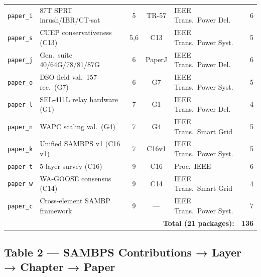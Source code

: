 \documentclass[11pt,a4paper]{article}
\begin{document}
{\begin{longtable}{llccp{3.0cm}r}
\rowcolor{ch5col!8}
\texttt{paper\_i} & 87T SPRT inrush/IBR/CT-sat & 5 & TR-57 & IEEE Trans.\ Power Del. & 6 \\
\rowcolor{ch5col!8}
\texttt{paper\_s} & CUEP conservativeness (C13) & 5,6 & C13 & IEEE Trans.\ Power Syst. & 5 \\
\rowcolor{ch6col!8}
\texttt{paper\_j} & Gen.\ suite 40/64G/78/81/87G & 6 & PaperJ & IEEE Trans.\ Power Del. & 6 \\
\rowcolor{ch6col!8}
\texttt{paper\_o} & DSO field val.\ 157 rec.\ (G7) & 6 & G7 & IEEE Trans.\ Power Syst. & 5 \\
\rowcolor{ch7col!8}
\texttt{paper\_l} & SEL-411L relay hardware (G1) & 7 & G1 & IEEE Trans.\ Power Del. & 4 \\
\rowcolor{ch7col!8}
\texttt{paper\_n} & WAPC scaling val.\ (G4) & 7 & G4 & IEEE Trans.\ Smart Grid & 5 \\
\rowcolor{ch7col!8}
\texttt{paper\_k} & Unified SAMBPS v1 (C16 v1) & 7 & C16v1 & IEEE Trans.\ Power Syst. & 5 \\
\rowcolor{ch9col!8}
\texttt{paper\_t} & 5-layer survey (C16) & 9 & C16 & Proc.\ IEEE & 6 \\
\rowcolor{ch9col!8}
\texttt{paper\_w} & WA-GOOSE consensus (C14) & 9 & C14 & IEEE Trans.\ Smart Grid & 4 \\
\rowcolor{ch9col!8}
\texttt{paper\_c} & Cross-element SAMBP framework & 9 & --- & IEEE Trans.\ Power Syst. & 7 \\
\midrule
\multicolumn{5}{r}{\textbf{Total (21 packages):}} & \textbf{136} \\
\end{longtable}}

\subsection*{Table 2 — SAMBPS Contributions → Layer → Chapter → Paper}
\end{document}
